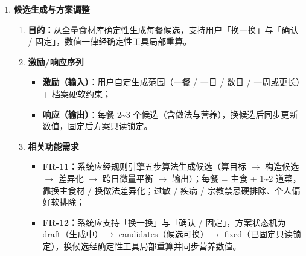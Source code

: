 \documentclass[12pt,a4paper]{ctexart}
\begin{document}
\begin{enumerate}
\item \textbf{候选生成与方案调整}
  \begin{enumerate}[label=(\arabic*), leftmargin=10pt, itemsep=2pt, topsep=2pt]
    \item \textbf{目的：}从全量食材库确定性生成每餐候选，支持用户「换一换」与「确认 / 固定」，数值一律经确定性工具局部重算。
    \item \textbf{激励/响应序列}
      \begin{itemize}[leftmargin=*, itemsep=1pt, topsep=1pt]
        \item \textbf{激励（输入）}：用户自定生成范围（一餐 / 一日 / 数日 / 一周或更长）+ 档案硬软约束；
        \item \textbf{响应（输出）}：每餐 2\textasciitilde{}3 个候选（含做法与营养），换候选后同步更新数值，固定后方案只读锁定。
      \end{itemize}
    \item \textbf{相关功能需求}
      \begin{itemize}[leftmargin=*, itemsep=1pt, topsep=1pt]
        \item \textbf{FR-11：}系统应经规则引擎五步算法生成候选（算目标 $\rightarrow$ 构造候选 $\rightarrow$ 差异化 $\rightarrow$ 跨日微量平衡 $\rightarrow$ 输出）；每餐 = 主食 + 1\textasciitilde{}2 道菜，靠换主食材 / 换做法差异化；过敏 / 疾病 / 宗教禁忌硬排除、个人偏好软排除；
        \item \textbf{FR-12：}系统应支持「换一换」与「确认 / 固定」，方案状态机为 draft（生成中）$\rightarrow$ candidates（候选可换）$\rightarrow$ fixed（已固定只读锁定），换候选经确定性工具局部重算并同步营养数值。
      \end{itemize}
  \end{enumerate}


\end{enumerate}
\end{document}
